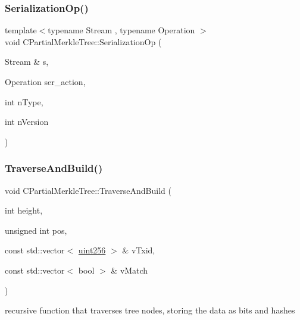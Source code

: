 \subsubsection{\texorpdfstring{Serialization\+Op()}{SerializationOp()}}
{\footnotesize\ttfamily template$<$typename Stream , typename Operation $>$ \\
void C\+Partial\+Merkle\+Tree\+::\+Serialization\+Op (\begin{DoxyParamCaption}\item[{Stream \&}]{s,  }\item[{Operation}]{ser\+\_\+action,  }\item[{int}]{n\+Type,  }\item[{int}]{n\+Version }\end{DoxyParamCaption})\hspace{0.3cm}{\ttfamily [inline]}}

\mbox{\label{class_c_partial_merkle_tree_a62bdcaf5b5ee6c6327ef67fb027a5fef}} 
\subsubsection{\texorpdfstring{Traverse\+And\+Build()}{TraverseAndBuild()}}
{\footnotesize\ttfamily void C\+Partial\+Merkle\+Tree\+::\+Traverse\+And\+Build (\begin{DoxyParamCaption}\item[{int}]{height,  }\item[{unsigned int}]{pos,  }\item[{const std\+::vector$<$ \mbox{\hyperlink{classuint256}{uint256}} $>$ \&}]{v\+Txid,  }\item[{const std\+::vector$<$ bool $>$ \&}]{v\+Match }\end{DoxyParamCaption})\hspace{0.3cm}{\ttfamily [protected]}}

recursive function that traverses tree nodes, storing the data as bits and hashes \mbox{\label{class_c_partial_merkle_tree_a3ddbe75a92d93059c30f6e60bacc7054}} 
